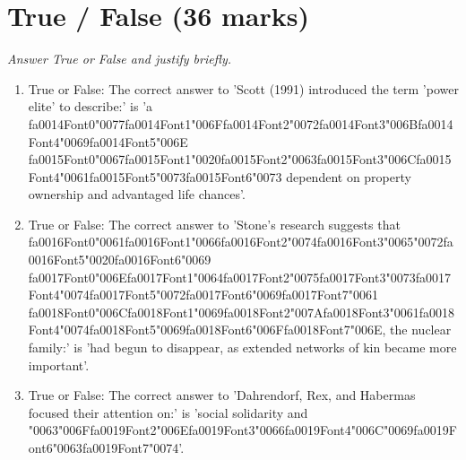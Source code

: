 \documentclass[12pt]{article}
\begin{document}
\section*{True / False (36 marks)}
\textit{Answer True or False and justify briefly.}
\begin{enumerate}[label=\arabic*.]
\item True or False: The correct answer to 'Scott (1991) introduced the term 'power elite' to describe:' is 'a {\csname fa0014Font0\endcsname\char"0077}{\csname fa0014Font1\endcsname\char"006F}{\csname fa0014Font2\endcsname\char"0072}{\csname fa0014Font3\endcsname\char"006B}{\csname fa0014Font4\endcsname\char"0069}{\csname fa0014Font5\endcsname\char"006E} {\csname fa0015Font0\endcsname\char"0067}{\csname fa0015Font1\endcsname\char"0020}{\csname fa0015Font2\endcsname\char"0063}{\csname fa0015Font3\endcsname\char"006C}{\csname fa0015Font4\endcsname\char"0061}{\csname fa0015Font5\endcsname\char"0073}{\csname fa0015Font6\endcsname\char"0073} dependent on property ownership and advantaged life chances'.
\item True or False: The correct answer to 'Stone's research suggests that {\csname fa0016Font0\endcsname\char"0061}{\csname fa0016Font1\endcsname\char"0066}{\csname fa0016Font2\endcsname\char"0074}{\csname fa0016Font3\endcsname\char"0065}{\char"0072}{\csname fa0016Font5\endcsname\char"0020}{\csname fa0016Font6\endcsname\char"0069} {\csname fa0017Font0\endcsname\char"006E}{\csname fa0017Font1\endcsname\char"0064}{\csname fa0017Font2\endcsname\char"0075}{\csname fa0017Font3\endcsname\char"0073}{\csname fa0017Font4\endcsname\char"0074}{\csname fa0017Font5\endcsname\char"0072}{\csname fa0017Font6\endcsname\char"0069}{\csname fa0017Font7\endcsname\char"0061} {\csname fa0018Font0\endcsname\char"006C}{\csname fa0018Font1\endcsname\char"0069}{\csname fa0018Font2\endcsname\char"007A}{\csname fa0018Font3\endcsname\char"0061}{\csname fa0018Font4\endcsname\char"0074}{\csname fa0018Font5\endcsname\char"0069}{\csname fa0018Font6\endcsname\char"006F}{\csname fa0018Font7\endcsname\char"006E}, the nuclear family:' is 'had begun to disappear, as extended networks of kin became more important'.
\item True or False: The correct answer to 'Dahrendorf, Rex, and Habermas focused their attention on:' is 'social solidarity and {\char"0063}{\char"006F}{\csname fa0019Font2\endcsname\char"006E}{\csname fa0019Font3\endcsname\char"0066}{\csname fa0019Font4\endcsname\char"006C}{\char"0069}{\csname fa0019Font6\endcsname\char"0063}{\csname fa0019Font7\endcsname\char"0074}'.

\end{enumerate}
\end{document}
